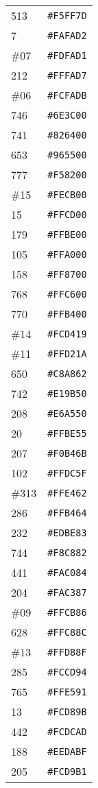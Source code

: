 \documentclass[a4paper]{article}
\begin{document}
\begin{longtable}{|l|r|}
513 & \texttt{\#F5FF7D} \\
7 & \texttt{\#FAFAD2} \\
\#07 & \texttt{\#FDFAD1} \\
212 & \texttt{\#FFFAD7} \\
\#06 & \texttt{\#FCFADB} \\
746 & \texttt{\#6E3C00} \\
741 & \texttt{\#826400} \\
653 & \texttt{\#965500} \\
777 & \texttt{\#F58200} \\
\#15 & \texttt{\#FECB00} \\
15 & \texttt{\#FFCD00} \\
179 & \texttt{\#FFBE00} \\
105 & \texttt{\#FFA000} \\
158 & \texttt{\#FF8700} \\
768 & \texttt{\#FFC600} \\
770 & \texttt{\#FFB400} \\
\#14 & \texttt{\#FCD419} \\
\#11 & \texttt{\#FFD21A} \\
650 & \texttt{\#C8A862} \\
742 & \texttt{\#E19B50} \\
208 & \texttt{\#E6A550} \\
20 & \texttt{\#FFBE55} \\
207 & \texttt{\#F0B46B} \\
102 & \texttt{\#FFDC5F} \\
\#313 & \texttt{\#FFE462} \\
286 & \texttt{\#FFB464} \\
232 & \texttt{\#EDBE83} \\
744 & \texttt{\#F8C882} \\
441 & \texttt{\#FAC084} \\
204 & \texttt{\#FAC387} \\
\#09 & \texttt{\#FFCB86} \\
628 & \texttt{\#FFC88C} \\
\#13 & \texttt{\#FFD88F} \\
285 & \texttt{\#FCCD94} \\
765 & \texttt{\#FFE591} \\
13 & \texttt{\#FCD89B} \\
442 & \texttt{\#FCDCAD} \\
188 & \texttt{\#EEDABF} \\
205 & \texttt{\#FCD9B1} \\

\end{longtable}
\end{document}
